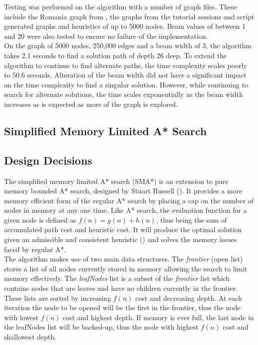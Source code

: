 \documentclass[]{article}
\begin{document}
Testing was performed on the algorithm with a number of graph files. These include the Romania graph from \cite{norvig}, the graphs from the tutorial sessions and script generated graphs and heuristics of up to 5000 nodes. Beam values of between 1 and 20 were also tested to ensure no failure of the implementation.\\

On the graph of 5000 nodes, 250,000 edges and a beam width of 3, the algorithm takes 2.1 seconds to find a solution path of depth 26 deep. To extend the algorithm to continue to find alternate paths, the time complexity scales poorly to 50.6 seconds. Alteration of the beam width did not have a significant impact on the time complexity to find a singular solution. However, while continuing to search for alternate solutions, the time scales exponentially as the beam width increases as is expected as more of the graph is explored.

\pagebreak

\begin{center}
	\section*{Simplified Memory Limited A* Search}
\end{center}

\vspace*{0.8cm}
\subsection*{Design Decisions}

The simplified memory limited A* search (SMA*) is an extension to pure memory bounded A* search, designed by Stuart Russell (\cite{russell_paper}). It provides a more memory efficient form of the regular A* search by placing a cap on the number of nodes in memory at any one time. Like A* search, the evaluation function for a given node is defined as $f(n)=g(n)+h(n)$, thus being the sum of accumulated path cost and heuristic cost. It will produce the optimal solution given an admissible and consistent heuristic (\cite{norvig}) and solves the memory issues faced by regular A*. \\

The algorithm makes use of two main data structures. The \textit{frontier} (open list) stores a list of all nodes currently stored in memory allowing the search to limit memory effectively. The \textit{leafNodes} list is a subset of the \textit{frontier} list which contains nodes that are leaves and have no children currently in the frontier. These lists are sorted by increasing $f(n)$ cost and decreasing depth. At each iteration the node to be opened will be the first in the frontier, thus the node with lowest $f(n)$ cost and highest depth. If memory is ever full, the last node in the leafNodes list will be backed-up, thus the node with highest $f(n)$ cost and shallowest depth.\\
\end{document}
